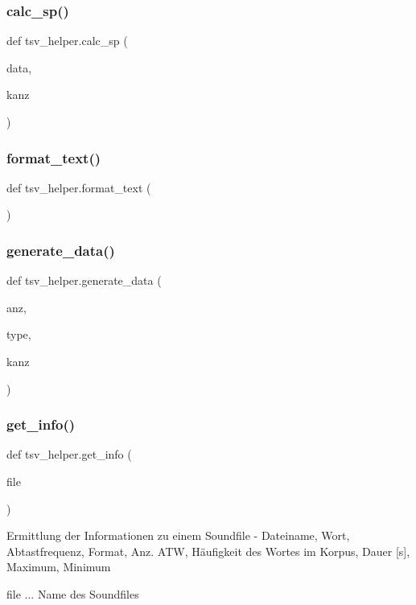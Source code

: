 \subsubsection{\texorpdfstring{calc\+\_\+sp()}{calc\_sp()}}
{\footnotesize\ttfamily def tsv\+\_\+helper.\+calc\+\_\+sp (\begin{DoxyParamCaption}\item[{}]{data,  }\item[{}]{kanz }\end{DoxyParamCaption})}

\mbox{\label{namespacetsv__helper_ac423d79f26a11d76d23d6da87b7e5945}} 
\subsubsection{\texorpdfstring{format\+\_\+text()}{format\_text()}}
{\footnotesize\ttfamily def tsv\+\_\+helper.\+format\+\_\+text (\begin{DoxyParamCaption}{ }\end{DoxyParamCaption})}

\mbox{\label{namespacetsv__helper_aaac50fa5ac9fbe9a50c232d043a2558e}} 
\subsubsection{\texorpdfstring{generate\+\_\+data()}{generate\_data()}}
{\footnotesize\ttfamily def tsv\+\_\+helper.\+generate\+\_\+data (\begin{DoxyParamCaption}\item[{}]{anz,  }\item[{}]{type,  }\item[{}]{kanz }\end{DoxyParamCaption})}

\mbox{\label{namespacetsv__helper_a3ef6b7f1fb139a5c1291101cbd83a5ce}} 
\subsubsection{\texorpdfstring{get\+\_\+info()}{get\_info()}}
{\footnotesize\ttfamily def tsv\+\_\+helper.\+get\+\_\+info (\begin{DoxyParamCaption}\item[{}]{file }\end{DoxyParamCaption})}

\begin{DoxyVerb}Ermittlung der Informationen zu einem Soundfile
- Dateiname, Wort, Abtastfrequenz, Format, Anz. ATW, Häufigkeit des Wortes im Korpus, Dauer [s], Maximum, Minimum

file ... Name des Soundfiles\end{DoxyVerb}
 
